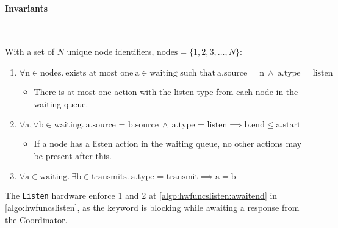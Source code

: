 
\clearpage

\paragraph{Invariants} \

With a set of $N$ unique node identifiers, $\text{nodes} = \{ 1, 2, 3, \ldots, N \}$:

\begin{enumerate}
    \item $\forall \text{n} \in \text{nodes}.\ \text{exists at most one}\ \text{a} \in \text{waiting such that} \ \text{a.source = n}\ \land\ \text{a.type = listen}$
     
    \begin{itemize}
        \item There is at most one action with the listen type from each node in the waiting queue.
    \end{itemize}
    \item $\forall \text{a}, \forall \text{b} \in \text{waiting}.\ \text{a.source = b.source}\ \land\ \text{a.type = listen} \implies \text{b.end} \leq \text{a.start}$
    \begin{itemize}
        \item If a node has a listen action in the waiting queue, no other actions may be present after this.
    \end{itemize}
    \item $\forall \text{a} \in \text{waiting}.\ \exists \text{b} \in \text{transmits}.\ \text{a.type = transmit} \implies \text{a} = \text{b} $ 
\end{enumerate}

The \texttt{Listen} hardware enforce 1 and 2 at \autoref{algo:hwfuncslisten:awaitend} in \autoref{algo:hwfuncslisten}, as the \KwAwait keyword is blocking while awaiting a response from the Coordinator. \medbreak

